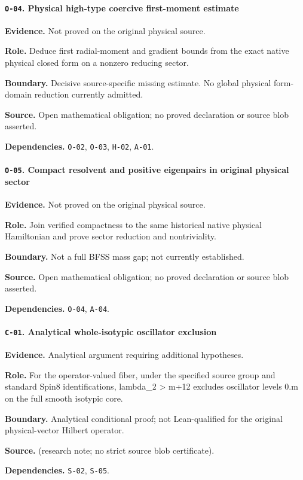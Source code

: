 \paragraph{\texttt{O-04}. Physical high-type coercive first-moment estimate}
\noindent\textbf{Evidence.} Not proved on the original physical source.
\par\noindent\textbf{Role.} Deduce first radial-moment and gradient bounds from the exact native physical closed form on a nonzero reducing sector.
\par\noindent\textbf{Boundary.} Decisive source-specific missing estimate. No global physical form-domain reduction currently admitted.
\par\noindent\textbf{Source.} Open mathematical obligation; no proved declaration or source blob asserted.
\par\noindent\textbf{Dependencies.} \texttt{O-02}, \texttt{O-03}, \texttt{H-02}, \texttt{A-01}.
\medskip

\paragraph{\texttt{O-05}. Compact resolvent and positive eigenpairs in original physical sector}
\noindent\textbf{Evidence.} Not proved on the original physical source.
\par\noindent\textbf{Role.} Join verified compactness to the same historical native physical Hamiltonian and prove sector reduction and nontriviality.
\par\noindent\textbf{Boundary.} Not a full BFSS mass gap; not currently established.
\par\noindent\textbf{Source.} Open mathematical obligation; no proved declaration or source blob asserted.
\par\noindent\textbf{Dependencies.} \texttt{O-04}, \texttt{A-04}.
\medskip

\paragraph{\texttt{C-01}. Analytical whole-isotypic oscillator exclusion}
\noindent\textbf{Evidence.} Analytical argument requiring additional hypotheses.
\par\noindent\textbf{Role.} For the operator-valued fiber, under the specified source group and standard Spin8 identifications, lambda\_2 > m+12 excludes oscillator levels 0.m on the full smooth isotypic core.
\par\noindent\textbf{Boundary.} Analytical conditional proof; not Lean-qualified for the original physical-vector Hilbert operator.
\par\noindent\textbf{Source.}  (research note; no strict source blob certificate).
\par\noindent\textbf{Dependencies.} \texttt{S-02}, \texttt{S-05}.
\medskip

